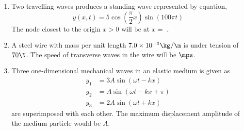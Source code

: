 \documentclass{article}
\def\ansint#1{\quad}
\begin{document}
\begin{enumerate}
\item Two travelling waves produces a standing wave represented by equation, \[ y(x, t) = 5\cos\left(\dfrac{\pi}{2}x\right)\sin\left(100\pi t\right)\] The node closest to the origin $x>0$ will be at $x=$ \hrulefill . \ansint{1}

\item A steel wire with mass per unit length $7.0\times 10^{-3}\kg/\m$ is under tension of $70\N$. The speed of transverse waves in the wire will be \hrulefill $\mps$. \ansint{100}
	
\item Three one-dimensional mechanical waves in an elastic medium is given as 
	\begin{align*}
		y_1 &= 3A\sin\left(\omega t - kx\right)\\
		y_2 &= A\sin\left(\omega t - kx + \pi\right)\\
		y_3 &= 2A\sin\left(\omega t + kx \right)
	\end{align*}
	are superimposed with each other. The maximum displacement amplitude of the medium particle would \linebreak be \hrulefill $A$. \ansint{4}

\end{enumerate}

\pagebreak


\end{document}
